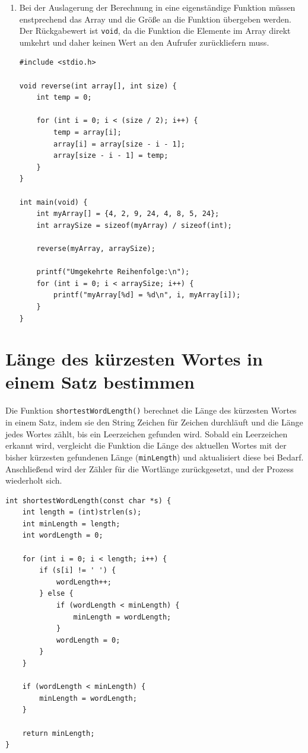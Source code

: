 \begin{enumerate}
\item Bei der Auslagerung der Berechnung in eine eigenständige Funktion müssen
enstprechend das Array und die Größe an die Funktion übergeben werden. Der
Rückgabewert ist \texttt{void}, da die Funktion die Elemente im Array
direkt umkehrt und daher keinen Wert an den Aufrufer zurückliefern muss.

\begin{verbatim}
#include <stdio.h>

void reverse(int array[], int size) {
    int temp = 0;

    for (int i = 0; i < (size / 2); i++) {
        temp = array[i];
        array[i] = array[size - i - 1];
        array[size - i - 1] = temp;
    }
}

int main(void) {
    int myArray[] = {4, 2, 9, 24, 4, 8, 5, 24};
    int arraySize = sizeof(myArray) / sizeof(int);

    reverse(myArray, arraySize);

    printf("Umgekehrte Reihenfolge:\n");
    for (int i = 0; i < arraySize; i++) {
        printf("myArray[%d] = %d\n", i, myArray[i]);
    }
}
\end{verbatim}

\end{enumerate}



\chapter{Länge des kürzesten Wortes in einem Satz bestimmen}

Die Funktion \texttt{shortestWordLength()} berechnet die Länge des
kürzesten Wortes in einem Satz, indem sie den String Zeichen für Zeichen
durchläuft und die Länge jedes Wortes zählt, bis ein Leerzeichen gefunden wird.
Sobald ein Leerzeichen erkannt wird, vergleicht die Funktion die Länge des
aktuellen Wortes mit der bisher kürzesten gefundenen Länge
(\texttt{minLength}) und aktualisiert diese bei Bedarf. Anschließend wird
der Zähler für die Wortlänge zurückgesetzt, und der Prozess wiederholt sich.

\begin{verbatim}
int shortestWordLength(const char *s) {
    int length = (int)strlen(s);
    int minLength = length;
    int wordLength = 0;

    for (int i = 0; i < length; i++) {
        if (s[i] != ' ') {
            wordLength++;
        } else {
            if (wordLength < minLength) {
                minLength = wordLength;
            }
            wordLength = 0;
        }
    }

    if (wordLength < minLength) {
        minLength = wordLength;
    }

    return minLength;
}
\end{verbatim}





